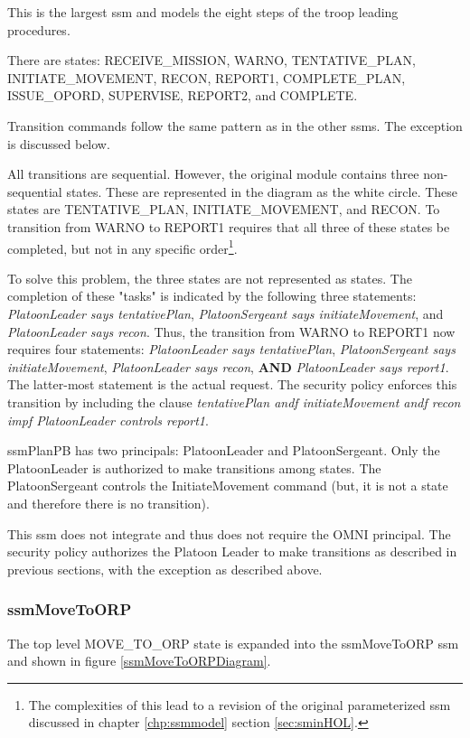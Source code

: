 \documentclass[../../main/main.tex]{subfiles}
\begin{document}
This is the largest \gls{ssm} and models the eight steps of the troop leading procedures.  

There are states: RECEIVE_MISSION, WARNO, TENTATIVE_PLAN, INITIATE_MOVEMENT, RECON, REPORT1, COMPLETE_PLAN, ISSUE_OPORD, SUPERVISE, REPORT2, and COMPLETE.

Transition commands follow the same pattern as in the other \gls{ssm}s.  The exception is discussed below.

All transitions are sequential.  However, the original module contains three non-sequential states.  These are represented in the diagram as the white circle. These states are TENTATIVE_PLAN, INITIATE_MOVEMENT, and RECON.  To transition from WARNO to REPORT1 requires that all three of these states be completed, but not in any specific order\footnote{The complexities of this  lead to a revision of the original parameterized \gls{ssm} discussed in chapter \ref{chp:ssmmodel} section \ref{sec:sminHOL}.}. 

To solve this problem, the three states are not represented as states.  The completion of these "tasks" is indicated by the following three statements: \textit{PlatoonLeader says tentativePlan}, \textit{PlatoonSergeant says initiateMovement}, and \textit{PlatoonLeader says recon}.  Thus, the transition from WARNO to REPORT1 now requires four statements: \textit{PlatoonLeader says tentativePlan}, \textit{PlatoonSergeant says initiateMovement}, \textit{PlatoonLeader says recon}, \textbf{AND} \textit{PlatoonLeader says report1}. The latter-most statement is the actual request.  The security policy enforces this transition by including the clause \textit{tentativePlan andf initiateMovement andf recon impf PlatoonLeader controls report1}.  

ssmPlanPB has two principals: PlatoonLeader and PlatoonSergeant.  Only the PlatoonLeader is authorized to make transitions among states.  The PlatoonSergeant controls the InitiateMovement command (but, it is not a state and therefore there is no transition).

This \gls{ssm} does not integrate and thus does not require the OMNI principal.  The security policy authorizes the Platoon Leader to make transitions as described in previous sections, with the exception as described above.  


\clearpage
\subsubsection{ssmMoveToORP}\label{sssec:ssmMoveToORP}
The top level MOVE_TO_ORP state is expanded into the ssmMoveToORP \gls{ssm} and shown in figure \ref{ssmMoveToORPDiagram}.
\end{document}
